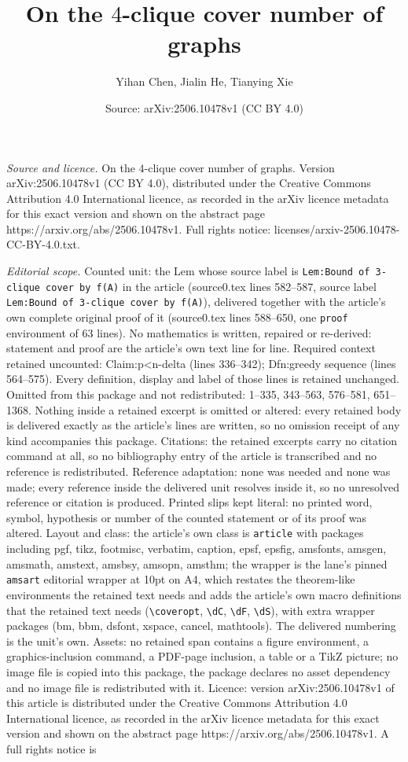 \documentclass[10pt,a4paper]{amsart}
\title[On the $4$-clique cover number of graphs]{On the $4$-clique cover number of graphs}
\author{Yihan Chen, Jialin He, Tianying Xie}
\date{Source: arXiv:2506.10478v1 (CC BY 4.0)}
\begin{document}
\maketitle

\noindent\emph{Source and licence.} On the $4$-clique cover number of graphs. Version arXiv:2506.10478v1 (CC BY 4.0), distributed under the Creative Commons Attribution 4.0 International licence, as recorded in the arXiv licence metadata for this exact version and shown on the abstract page https://arxiv.org/abs/2506.10478v1. Full rights notice: licenses/arxiv-2506.10478-CC-BY-4.0.txt.\par\smallskip

\noindent\textit{Editorial scope.} Counted unit: the Lem whose source label is \texttt{Lem:Bound of 3-clique cover by f(A)} in the article (source0.tex lines 582--587, source label \texttt{Lem:Bound of 3-clique cover by f(A)}), delivered together with the article's own complete original proof of it (source0.tex lines 588--650, one \texttt{proof} environment of 63 lines). No mathematics is written, repaired or re-derived: statement and proof are the article's own text line for line. Required context retained uncounted: Claim:p<n-delta (lines 336--342); Dfn:greedy sequence (lines 564--575). Every definition, display and label of those lines is retained unchanged. Omitted from this package and not redistributed: 1--335, 343--563, 576--581, 651--1368. Nothing inside a retained excerpt is omitted or altered: every retained body is delivered exactly as the article's lines are written, so no omission receipt of any kind accompanies this package. Citations: the retained excerpts carry no citation command at all, so no bibliography entry of the article is transcribed and no reference is redistributed. Reference adaptation: none was needed and none was made; every reference inside the delivered unit resolves inside it, so no unresolved reference or citation is produced. Printed slips kept literal: no printed word, symbol, hypothesis or number of the counted statement or of its proof was altered. Layout and class: the article's own class is \texttt{article} with packages including pgf, tikz, footmisc, verbatim, caption, epsf, epsfig, amsfonts, amsgen, amsmath, amstext, amsbsy, amsopn, amsthm; the wrapper is the lane's pinned \texttt{amsart} editorial wrapper at 10pt on A4, which restates the theorem-like environments the retained text needs and adds the article's own macro definitions that the retained text needs (\texttt{\textbackslash coveropt}, \texttt{\textbackslash dC}, \texttt{\textbackslash dF}, \texttt{\textbackslash dS}), with extra wrapper packages (bm, bbm, dsfont, xspace, cancel, mathtools). The delivered numbering is the unit's own. Assets: no retained span contains a figure environment, a graphics-inclusion command, a PDF-page inclusion, a table or a TikZ picture; no image file is copied into this package, the package declares no asset dependency and no image file is redistributed with it. Licence: version arXiv:2506.10478v1 of this article is distributed under the Creative Commons Attribution 4.0 International licence, as recorded in the arXiv licence metadata for this exact version and shown on the abstract page https://arxiv.org/abs/2506.10478v1. A full rights notice is 
\end{document}
